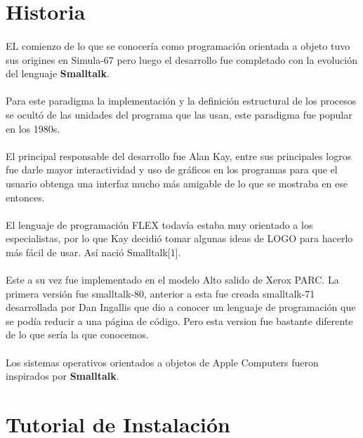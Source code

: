 \documentclass[11pt]{article}
\begin{document}
\section{Historia}
\paragraph{} \noindent
EL comienzo de lo que se conocería como programación orientada a objeto tuvo sus origines en Simula-67 pero luego el desarrollo fue completado con la evolución del lenguaje \textbf{Smalltalk}.
\paragraph{} \noindent
Para este paradigma la implementación y la definición estructural de los procesos se ocultó de las unidades del programa que las usan, este paradigma fue popular en los 1980s.
\paragraph{} \noindent
El principal responsable del desarrollo fue Alan Kay, entre sus principales logros fue darle mayor interactividad y uso de gráficos en los programas para que el usuario obtenga una interfaz mucho más amigable de lo que se mostraba en ese entonces.
\paragraph{} \noindent
El lenguaje de programación FLEX todavía estaba muy orientado a los especialistas, por lo que Kay decidió tomar algunas ideas de LOGO para hacerlo más fácil de usar. Así nació Smalltalk[1].
\paragraph{} \noindent
Este a su vez fue implementado en el modelo Alto salido de Xerox PARC. La primera versión fue smalltalk-80, anterior a esta fue creada smalltalk-71 desarrollada por Dan Ingallis que dio a conocer un lenguaje de programación que se podía reducir a una página de código. Pero esta version fue bastante diferente de lo que sería la que conocemos.
\paragraph{} \noindent
Los sistemas operativos orientados a objetos de Apple Computers fueron inspirados por \textbf{Smalltalk}.
\section{Tutorial de Instalación}
\end{document}
